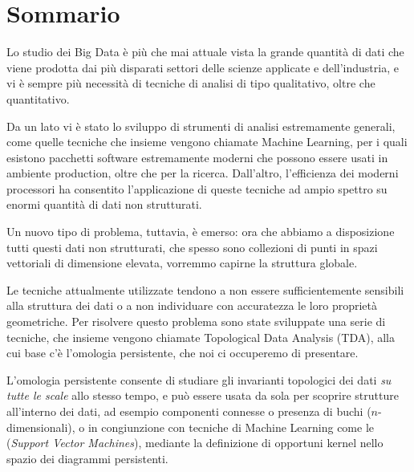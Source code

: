 \begingroup
\let\clearpage\relax
\let\cleardoublepage\relax
\let\cleardoublepage\relax

\chapter*{Sommario}

Lo studio dei Big Data è più che mai attuale vista la grande quantità di dati che viene prodotta dai più disparati settori delle scienze applicate e dell'industria, e vi è sempre più necessità di tecniche di analisi di tipo qualitativo, oltre che quantitativo.

Da un lato vi è stato lo sviluppo di strumenti di analisi estremamente generali, come quelle tecniche che insieme vengono chiamate Machine Learning, per i quali esistono pacchetti software estremamente moderni che possono essere usati in ambiente production, oltre che per la ricerca. Dall'altro, l'efficienza dei moderni processori ha consentito l'applicazione di queste tecniche ad ampio spettro su enormi quantità di dati non strutturati.

Un nuovo tipo di problema, tuttavia, è emerso: ora che abbiamo a disposizione tutti questi dati non strutturati, che spesso sono collezioni di punti in spazi vettoriali di dimensione elevata, vorremmo capirne la struttura globale.

Le tecniche attualmente utilizzate tendono a non essere sufficientemente sensibili alla struttura dei dati o a non individuare con accuratezza le loro proprietà geometriche. Per risolvere questo problema sono state sviluppate una serie di tecniche, che insieme vengono chiamate Topological Data Analysis (TDA), alla cui base c'è l'omologia persistente, che noi ci occuperemo di presentare.

L'omologia persistente consente di studiare gli invarianti topologici dei dati \emph{su tutte le scale} allo stesso tempo, e può essere usata da sola per scoprire strutture all'interno dei dati, ad esempio componenti connesse o presenza di buchi ($n$-dimensionali), o in congiunzione con tecniche di Machine Learning come le (\emph{Support Vector Machines}), mediante la definizione di opportuni kernel nello spazio dei diagrammi persistenti.

\vfill

\endgroup

\vfill
